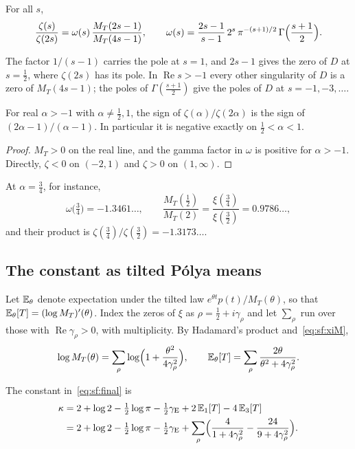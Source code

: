 \begin{proposition}\label{prop:sf:polya}
For all $s$,
\[
\frac{\zeta(s)}{\zeta(2s)}=\omega(s)\,\frac{M_T(2s-1)}{M_T(4s-1)},\qquad \omega(s)=\frac{2s-1}{s-1}\,2^{s}\,\pi^{-(s+1)/2}\,\Gamma\Bigl(\frac{s+1}{2}\Bigr).
\]
\end{proposition}

The factor $1/(s-1)$ carries the pole at $s=1$, and $2s-1$ gives the zero of $D$ at $s=\frac12$, where $\zeta(2s)$ has its pole. In $\operatorname{Re}s>-1$ every other singularity of $D$ is a zero of $M_T(4s-1)$; the poles of $\Gamma(\frac{s+1}2)$ give the poles of $D$ at $s=-1,-3,\dots$.

\begin{corollary}\label{cor:sf:sign}
For real $\alpha>-1$ with $\alpha\ne\frac12,1$, the sign of $\zeta(\alpha)/\zeta(2\alpha)$ is the sign of $(2\alpha-1)/(\alpha-1)$. In particular it is negative exactly on $\frac12<\alpha<1$.
\end{corollary}

\begin{proof}
$M_T>0$ on the real line, and the gamma factor in $\omega$ is positive for $\alpha>-1$. Directly, $\zeta<0$ on $(-2,1)$ and $\zeta>0$ on $(1,\infty)$.
\end{proof}

At $\alpha=\frac34$, for instance,
\[
\omega\bigl(\tfrac34\bigr)=-1.3461\ldots,\qquad \frac{M_T(\frac12)}{M_T(2)}=\frac{\xi(\frac34)}{\xi(\frac32)}=0.9786\ldots,
\]
and their product is $\zeta(\frac34)/\zeta(\frac32)=-1.3173\ldots$.

\subsection{The constant as tilted P\'olya means}
Let $\mathbb{E}_\theta$ denote expectation under the tilted law $e^{\theta t}p(t)/M_T(\theta)$, so that $\mathbb{E}_\theta[T]=(\log M_T)'(\theta)$. Index the zeros of $\xi$ as $\rho=\frac12+i\gamma_\rho$ and let $\sum_\rho$ run over those with $\operatorname{Re}\gamma_\rho>0$, with multiplicity. By Hadamard's product and~\eqref{eq:sf:xiM},
\begin{equation}\label{eq:sf:logM}
\log M_T(\theta)=\sum_\rho\log\Bigl(1+\frac{\theta^2}{4\gamma_\rho^2}\Bigr),\qquad \mathbb{E}_\theta[T]=\sum_\rho\frac{2\theta}{\theta^2+4\gamma_\rho^2}.
\end{equation}

\begin{theorem}\label{thm:sf:const}
The constant in~\eqref{eq:sf:final} is
\[
\begin{aligned}
\kappa&=2+\log2-\tfrac12\log\pi-\tfrac12\gamma_{\mathrm E}+2\,\mathbb{E}_1[T]-4\,\mathbb{E}_3[T]\\
&=2+\log2-\tfrac12\log\pi-\tfrac12\gamma_{\mathrm E}+\sum_\rho\Bigl(\frac{4}{1+4\gamma_\rho^2}-\frac{24}{9+4\gamma_\rho^2}\Bigr).
\end{aligned}
\]
\end{theorem}

